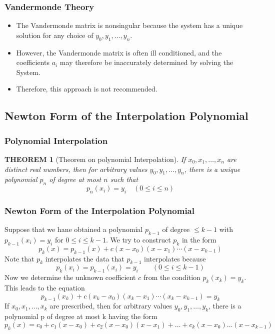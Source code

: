 \documentclass[notheorems,mathserif,table,compress]{beamer}  %
\begin{document}
\begin{frame}
  \frametitle{Vandermonde Theory}
  \begin{itemize}
  \item The Vandermonde matrix is nonsingular because the system has a unique solution for any choice of $y_0,y_1,\ldots,y_n$.
  \item However, the Vandermonde matrix is often ill conditioned, and the coefficients $a_i$ may therefore be inaccurately determined by solving the System.
  \item Therefore, this approach is not recommended.
  \end{itemize}
\end{frame}


\subsection{Newton Form of the Interpolation Polynomial}
 

\begin{frame}
  \frametitle{Polynomial Interpolation}
  \newtheorem{theorem 1}{THEOREM}
  \begin{theorem 1}[Theorem on polynomial Interpolation]
  If $x_0,x_1,\ldots,x_n$ are distinct real numbers, then for arbitrary values $y_0,y_1,\ldots,y_n$, there is a unique polynomial $p_n$ of degree at most $n$ such that
  \begin{displaymath}
  p_n(x_i)=y_i \quad (0 \le i \le n)
  \end{displaymath}
  \end{theorem 1} 
\end{frame}


\begin{frame}
  \frametitle{Newton Form of the Interpolation Polynomial}
  Suppose that we hane obtained a polynomial $p_{k-1}$ of degree $\le k-1$ with $p_{k-1}(x_i)=y_i$ for $0 \le i \le k-1$. We try to construct $p_k$ in the form
  \[ p_k(x)=p_{k-1}(x)+c(x-x_0)(x-x_1)\cdots(x-x_{k-1}) \]
  Note that $p_k$ interpolates the data that $p_{k-1}$ interpolates because
  \[ p_k(x_i)=p_{k-1}(x_i)=y_i \qquad (0 \le i \le k-1) \]
  Now we determine the unknown coefficient $c$ from the condition $p_k(x_k)=y_k$. This leads to the equation
  \[ p_{k-1}(x_k)+c(x_k-x_0)(x_k-x_1)\cdots(x_k-x_{k-1})=y_k \]
  If $x_0,x_1,\ldots,x_k$ are prescribed, then for arbitrary values $y_0,y_1,\ldots,y_k$, there is a polynomial p of degree at most k having the form
  \[ p_k(x)=c_0+c_1(x-x_0)+c_2(x-x_0)(x-x_1)+\ldots+c_k(x-x_0)\ldots(x-x_{k-1}) \]
  
\end{frame}
\end{document}
